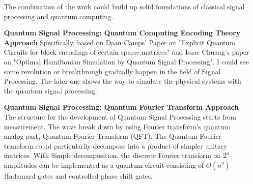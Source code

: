 \documentclass{article}
\begin{document}
The combination of the work could build up solid foundations of 
classical signal processing and quantum computing. 

\textbf{Quantum Signal Processing: Quantum Computing Encoding Theory Approach}\newline
Specifically, based on Daan Camps' Paper on "Explicit Quantum Circuits 
for block encodings of certain sparse matrices" and Issac Chuang's paper
on "Optimal Hamiltonian Simulation by Quantum Signal Processing". I could 
see some revolution or breakthrough gradually happen in the field of Signal
Processing. The later one shows the way to simulate the physical systems with 
the quantum signal processing. 

\textbf{Quantum Signal Processing: Quantum Fourier Transform Approach}\newline
The structure for the development of Quantum Signal Processing starts from 
measurement. The wave break down by using Fourier transform's quantum analog
part, Quantum Fourier Transform (QFT). The Quantum Fourier transform could 
particularlly decompose into a product of simpler unitary matrices. 
With Simple decomposition, the discrete Fourier transform on $2^n$ amplitudes 
can be implemented as a quantum circuit consisting of $O(n^2)$ Hadamard 
gates and controlled phase shift gates. 
\end{document}
